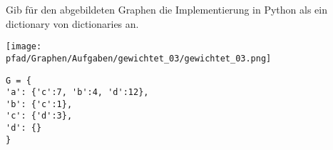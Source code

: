 ﻿\question[4]
Gib für den abgebildeten Graphen die Implementierung in Python als
ein dictionary von dictionaries an.

\texttt{[image: \\pfad/Graphen/Aufgaben/gewichtet\_03/gewichtet\_03.png]}
\begin{solutionbox}{5cm}
\begin{lstlisting}
G = {
'a': {'c':7, 'b':4, 'd':12},
'b': {'c':1},
'c': {'d':3},
'd': {}
}
\end{lstlisting}
\end{solutionbox}
